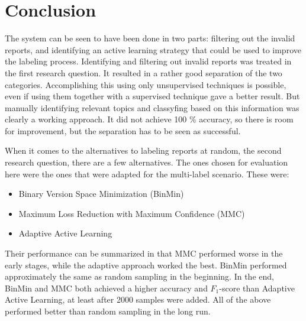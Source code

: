 
\chapter{Conclusion}
\label{cha:conclusion}

The system can be seen to have been done in two parts: filtering out the invalid reports, and identifying an active learning strategy that could be used to improve the labeling process.
Identifying and filtering out invalid reports was treated in the first research question.
It resulted in a rather good separation of the two categories.
Accomplishing this using only unsupervised techniques is possible, even if using them together with a supervised technique gave a better result.
But manually identifying relevant topics and classyfing based on this information was clearly a working approach.
It did not achieve 100 \% accuracy, so there is room for improvement, but the separation has to be seen as successful.

When it comes to the alternatives to labeling reports at random, the second research question, there are a few alternatives.
The ones chosen for evaluation here were the ones that were adapted for the multi-label scenario.
These were: 
\begin{itemize}
    \item Binary Version Space Minimization (BinMin)
    \item Maximum Loss Reduction with Maximum Confidence (MMC)
    \item Adaptive Active Learning 
\end{itemize}
Their performance can be summarized in that MMC performed worse in the early stages, while the adaptive approach worked the best.
BinMin performed approximately the same as random sampling in the beginning.
In the end, BinMin and MMC both achieved a higher accuracy and $F_1$-score than Adaptive Active Learning, at least after 2000 samples were added.
All of the above performed better than random sampling in the long run.

